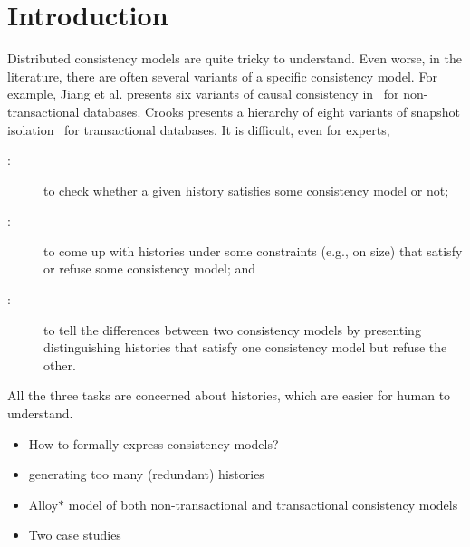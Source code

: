 
\section{Introduction} \label{section:intro}

Distributed consistency models are quite tricky to understand.
Even worse, in the literature, there are often several variants of a specific consistency model.
For example, Jiang et al. presents six variants of causal consistency in~\cite{SpecFramework:SRDS2020} for non-transactional databases.
Crooks presents a hierarchy of eight variants of snapshot isolation~\cite{Crooks:PODC2017} for transactional databases.
It is difficult, even for experts,
\begin{description}
  \item[\taskchecking:] to check whether a given history satisfies some consistency model or not;
  \item[\taskgenerating:] to come up with histories under some constraints (e.g., on size)
    that satisfy or refuse some consistency model; and
  \item[\taskcomparing:] to tell the differences between two consistency models
    by presenting distinguishing histories that satisfy one consistency model but refuse the other.
\end{description}
All the three tasks are concerned about histories, which are easier for human to understand.



\begin{itemize}
  \item How to formally express consistency models?
  \item generating too many (redundant) histories
\end{itemize}

\begin{itemize}
  \item Alloy$\ast$ model of both non-transactional and transactional consistency models
  \item Two case studies
\end{itemize}
